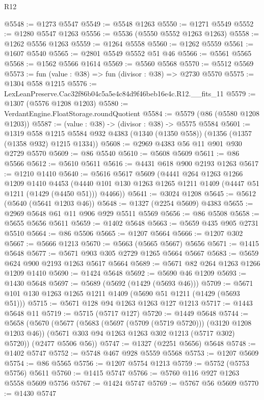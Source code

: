 \begin{lexlean}{R12}
\begin{coremodule}
@5548 := @1273 @5547
@5549 := @5548 @1263
@5550 := @1271 @5549
@5552 := @1280 @5547 @1263
@5556 := @5536 (@5550 @5552 @1263 @1263)
@5558 := @1262 @5556 @1263
@5559 := @1264 @5558
@5560 := @1262 @5559
@5561 := @1607 @5540
@5565 := @2801 @5549 @5552 @51 @46
@5566 := @5561 @5565
@5568 := @1562 @5566 @1614
@5569 := @5560 @5568
@5570 := @5512 @5569
@5573 := fun (value : @38) => fun (divisor : @38) => @2730 @5570
@5575 := @1304 @558 @1215
@5576 := LexLeanPreserve.Cac32f86b04c5a5e4c84d9f46beb16e4c.R12.__fits_11
@5579 := @1307 (@5576 @1208 @1203)
@5580 := VerdantEngine.FloatStorage.roundQuotient
@5584 := @5579 (@86 (@5580 @1208 @1203))
@5587 := (value : @38) -> (divisor : @38) -> @5575 @5584
@5601 := @1319
    @558
    @1215
    @5584
    @932
    @4383
    (@1340 (@1350 @558))
    (@1356 (@1357 (@1358 @932) @1215 @1334))
@5608 := @2969 @4383 @56 @11 @901 @930 @2729 @5570
@5609 := @86 @5540
@5610 := @5608 @5609
@5611 := @86 @5566
@5612 := @5610 @5611
@5616 := @4431 @618 @900 @2193 @1263
@5617 := @1210 @1410
@5640 := @5616
    @5617
    @5609
    (@4441
      @264
      @1263
      @1266
      @1209
      @1410
      @4453
      (@4440 @101 @130 @1263 @1265 @1211 @1409 (@4447 @51 @1211 (@1429 (@4450 @51))) @4466))
@5641 := @3024 @1208
@5645 := @5612 (@5640 (@5641 @1203 @46))
@5648 := @1327 (@2254 @5609) @4383
@5655 := @2969 @5648 @61 @11 @906 @929 @5511 @5569
@5656 := @86 @5508
@5658 := @5655 @5656 @5611
@5659 := @1402 @5648
@5663 := @5659 @435 @905 @2731 @5510
@5664 := @86 @5506
@5665 := @1207 @5664
@5666 := @1207 @302
@5667 := @5666 @1213
@5670 := @5663 (@5665 @5667) @5656
@5671 := @1415 @5648
@5677 := @5671 @903 @305 @2729 @1265 @5664 @5667
@5683 := @5659 @624 @900 @2193 @1263 @5617 @5664
@5689 := @5671 @82 @264 @1263 @1266 @1209 @1410
@5690 := @1424 @5648
@5692 := @5690 @46 @1209
@5693 := @1430 @5648
@5697 := @5689 (@5692 (@1429 (@5693 @46)))
@5709 := @5671 @101 @130 @1263 @1265 @1211 @1409 (@5690 @51 @1211 (@1429 (@5693 @51)))
@5715 := @5671 @128 @94 @1263 @1263 @127 @1213
@5717 := @1443 @5648 @11
@5719 := @5715 (@5717 @127)
@5720 := @1449 @5648
@5744 := @5658
    (@5670
      (@5677
        (@5683 (@5697 (@5709 (@5719 @5720))) (@3120 @1208 @1203 @46))
        (@5671 @303 @94 @1263 @1263 @302 @1213 (@5717 @302) @5720))
      (@2477 @5506 @56))
@5747 := @1327 (@2251 @5656) @5648
@5748 := @1402 @5747
@5752 := @5748 @467 @928 @5559 @5568
@5753 := @1207 @5609
@5754 := @86 @5565
@5756 := @1207 @5754 @1213
@5759 := @5752 (@5753 @5756) @5611
@5760 := @1415 @5747
@5766 := @5760 @116 @927 @1263 @5558 @5609 @5756
@5767 := @1424 @5747
@5769 := @5767 @56 @5609
@5770 := @1430 @5747

\end{coremodule}
\end{lexlean}
